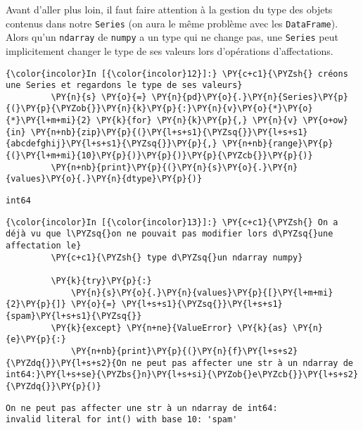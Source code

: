     Avant d'aller plus loin, il faut faire attention à la gestion du type
des objets contenus dans notre \texttt{Series} (on aura le même problème
avec les \texttt{DataFrame}). Alors qu'un \texttt{ndarray} de
\texttt{numpy} a un type qui ne change pas, une \texttt{Series} peut
implicitement changer le type de ses valeurs lors d'opérations
d'affectations.

    \begin{Verbatim}[commandchars=\\\{\}]
{\color{incolor}In [{\color{incolor}12}]:} \PY{c+c1}{\PYZsh{} créons une Series et regardons le type de ses valeurs}
         \PY{n}{s} \PY{o}{=} \PY{n}{pd}\PY{o}{.}\PY{n}{Series}\PY{p}{(}\PY{p}{\PYZob{}}\PY{n}{k}\PY{p}{:}\PY{n}{v}\PY{o}{*}\PY{o}{*}\PY{l+m+mi}{2} \PY{k}{for} \PY{n}{k}\PY{p}{,} \PY{n}{v} \PY{o+ow}{in} \PY{n+nb}{zip}\PY{p}{(}\PY{l+s+s1}{\PYZsq{}}\PY{l+s+s1}{abcdefghij}\PY{l+s+s1}{\PYZsq{}}\PY{p}{,} \PY{n+nb}{range}\PY{p}{(}\PY{l+m+mi}{10}\PY{p}{)}\PY{p}{)}\PY{p}{\PYZcb{}}\PY{p}{)}
         \PY{n+nb}{print}\PY{p}{(}\PY{n}{s}\PY{o}{.}\PY{n}{values}\PY{o}{.}\PY{n}{dtype}\PY{p}{)}
\end{Verbatim}


    \begin{Verbatim}[commandchars=\\\{\}]
int64

    \end{Verbatim}

    \begin{Verbatim}[commandchars=\\\{\}]
{\color{incolor}In [{\color{incolor}13}]:} \PY{c+c1}{\PYZsh{} On a déjà vu que l\PYZsq{}on ne pouvait pas modifier lors d\PYZsq{}une affectation le}
         \PY{c+c1}{\PYZsh{} type d\PYZsq{}un ndarray numpy}
         
         \PY{k}{try}\PY{p}{:}
             \PY{n}{s}\PY{o}{.}\PY{n}{values}\PY{p}{[}\PY{l+m+mi}{2}\PY{p}{]} \PY{o}{=} \PY{l+s+s1}{\PYZsq{}}\PY{l+s+s1}{spam}\PY{l+s+s1}{\PYZsq{}}
         \PY{k}{except} \PY{n+ne}{ValueError} \PY{k}{as} \PY{n}{e}\PY{p}{:}
             \PY{n+nb}{print}\PY{p}{(}\PY{n}{f}\PY{l+s+s2}{\PYZdq{}}\PY{l+s+s2}{On ne peut pas affecter une str à un ndarray de int64:}\PY{l+s+se}{\PYZbs{}n}\PY{l+s+si}{\PYZob{}e\PYZcb{}}\PY{l+s+s2}{\PYZdq{}}\PY{p}{)}
\end{Verbatim}


    \begin{Verbatim}[commandchars=\\\{\}]
On ne peut pas affecter une str à un ndarray de int64:
invalid literal for int() with base 10: 'spam'

    \end{Verbatim}

